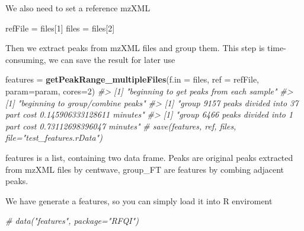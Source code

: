 \documentclass[
]{article}
\newenvironment{Shaded}{\begin{snugshade}}{\end{snugshade}}
\newcommand{\CommentTok}[1]{\textcolor[rgb]{0.56,0.35,0.01}{\textit{#1}}}
\newcommand{\DataTypeTok}[1]{\textcolor[rgb]{0.13,0.29,0.53}{#1}}
\newcommand{\DecValTok}[1]{\textcolor[rgb]{0.00,0.00,0.81}{#1}}
\newcommand{\KeywordTok}[1]{\textcolor[rgb]{0.13,0.29,0.53}{\textbf{#1}}}
\newcommand{\NormalTok}[1]{#1}
\newcommand{\StringTok}[1]{\textcolor[rgb]{0.31,0.60,0.02}{#1}}
\begin{document}
We also need to set a reference mzXML

\begin{Shaded}
\begin{Highlighting}[]
\NormalTok{refFile =}\StringTok{ }\NormalTok{files[}\DecValTok{1}\NormalTok{]}
\NormalTok{files =}\StringTok{ }\NormalTok{files[}\DecValTok{2}\NormalTok{]}
\end{Highlighting}
\end{Shaded}

Then we extract peaks from mzXML files and group them. This step is
time-consuming, we can save the result for later use

\begin{Shaded}
\begin{Highlighting}[]
\NormalTok{features =}\StringTok{ }\KeywordTok{getPeakRange_multipleFiles}\NormalTok{(}\DataTypeTok{f.in =}\NormalTok{ files, }\DataTypeTok{ref =}\NormalTok{ refFile, }\DataTypeTok{param=}\NormalTok{param, }\DataTypeTok{cores=}\DecValTok{2}\NormalTok{)}
\CommentTok{#> [1] "beginning to get peaks from each sample"}
\CommentTok{#> [1] "beginning to group/combine peaks"}
\CommentTok{#> [1] "group 9157 peaks divided into 37 part cost 0.145906333128611 minutes"}
\CommentTok{#> [1] "group 6466 peaks divided into 1 part cost 0.73112698396047 minutes"}
\CommentTok{# save(features, ref, files, file="test_features.rData")}
\end{Highlighting}
\end{Shaded}

features is a list, containing two data frame. Peaks are original peaks
extracted from mzXML files by centwave, group\_FT are features by
combing adjacent peaks.

\begin{Shaded}
\end{Shaded}

We have generate a features, so you can simply load it into R enviroment

\begin{Shaded}
\begin{Highlighting}[]
\CommentTok{# data("features", package="RFQI")}
\end{Highlighting}
\end{Shaded}
\end{document}

